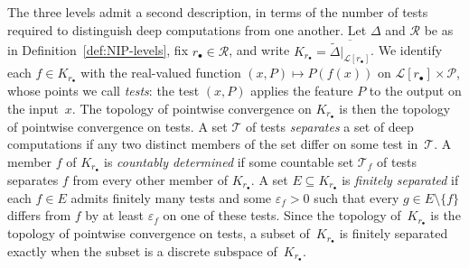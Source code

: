 \documentclass[psamsfonts]{amsart}
\theoremstyle{definition}
\theoremstyle{remark}
\numberwithin{equation}{section}
\begin{document}
\begin{center}
\end{center}

The three levels admit a second description, in terms of the number of tests required to distinguish deep computations from one another.
Let $\Delta$ and $\mathscr{R}$ be as in Definition~\ref{def:NIP-levels}, fix $r_\bullet\in \mathscr{R}$, and write $K_{r_\bullet}=\overline{\tilde\Delta|_{\mathcal{L}[r_\bullet]}}$.
We identify each $f\in K_{r_\bullet}$ with the real-valued function $(x,P)\mapsto P(f(x))$ on $\mathcal{L}[r_\bullet]\times\mathcal{P}$, whose points we call \emph{tests}:
the test $(x,P)$ applies the feature $P$ to the output on the input~$x$.
The topology of pointwise convergence on $K_{r_\bullet}$ is then the topology of pointwise convergence on tests.
A set $\mathcal{T}$ of tests \emph{separates} a set of deep computations if any two distinct members of the set differ on some test in~$\mathcal{T}$.
A member $f$ of $K_{r_\bullet}$ is \emph{countably determined} if some countable set $\mathcal{T}_f$ of tests separates $f$ from every other member of $K_{r_\bullet}$.
A set $E\subseteq K_{r_\bullet}$ is \emph{finitely separated} if each $f\in E$ admits finitely many tests and some $\varepsilon_f>0$ such that every $g\in E\setminus\{f\}$ differs from $f$ by at least $\varepsilon_f$ on one of these tests.
Since the topology of~$K_{r_\bullet}$ is the topology of pointwise convergence on tests, a subset of~$K_{r_\bullet}$ is finitely separated exactly when the subset is a discrete subspace of~$K_{r_\bullet}$.
\end{document}
